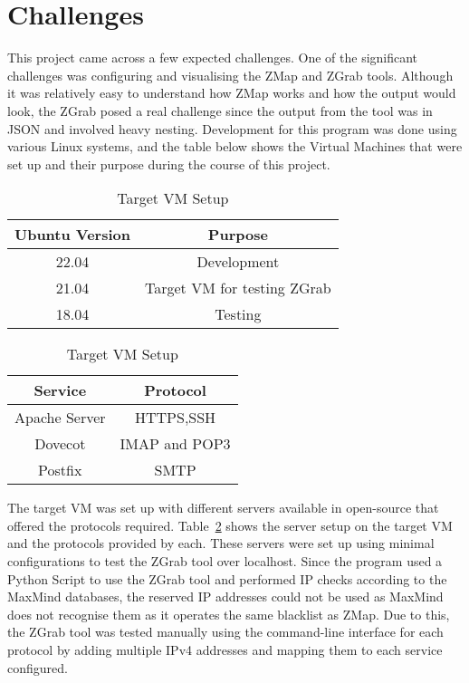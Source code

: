 \section{Challenges}
\label{challenges}
This project came across a few expected challenges. One of the significant challenges was configuring and visualising the ZMap and ZGrab tools. Although it was relatively 
easy to understand how ZMap works and how the output would look, the ZGrab posed a real challenge since the output from the tool was in JSON and involved heavy nesting.
Development for this program was done using various Linux systems, and the table below shows the Virtual Machines that were set up and 
their purpose during the course of this project.

\begin{table}[h!]
    \centering
    \begin{tabular}{|c|c|}
        \hline
        Ubuntu Version  &   Purpose\\
        \hline
        22.04   &   Development \\
        \hline
        21.04   &   Target VM for testing ZGrab\\
        \hline
        18.04   &   Testing\\
        \hline
    \end{tabular}
    \caption{VM Setup}
    \label{vm:vmsetup}

    \quad
    
    \begin{tabular}{|c|c|}
        \hline
        Service  &   Protocol\\
        \hline
        Apache Server   &   HTTPS,SSH\\
        \hline
        Dovecot   &   IMAP and POP3\\
        \hline
        Postfix   &   SMTP\\
        \hline
    \end{tabular}
    \caption{Target VM Setup}
    \label{tab:targetvmsetup}
\end{table}

\noindent The target VM was set up with different servers available in open-source that offered the protocols required. Table~\ref*{tab:targetvmsetup} 
shows the server setup on the target VM and the protocols provided by each. These servers were set up using minimal configurations to test the ZGrab 
tool over localhost. Since the program used a Python Script to use the ZGrab tool and performed IP checks according to the MaxMind databases, 
the reserved IP addresses could not be used as MaxMind does not recognise them as it operates the same blacklist as ZMap. 
Due to this, the ZGrab tool was tested manually using the command-line interface for each protocol by adding multiple IPv4 addresses and mapping 
them to each service configured.




